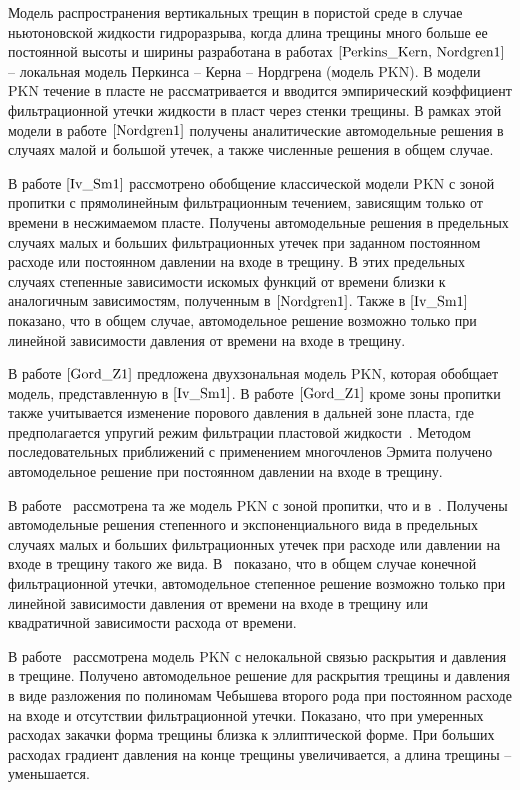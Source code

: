 Модель распространения вертикальных трещин в пористой среде в случае ньютоновской жидкости гидроразрыва, когда длина трещины много больше ее постоянной высоты и ширины разработана в работах$~\cite{Perkins_Kern, Nordgren1}$ – локальная модель Перкинса – Керна – Нордгрена (модель PKN). В модели PKN течение в пласте не рассматривается и вводится эмпирический коэффициент фильтрационной утечки жидкости в пласт через стенки трещины. В рамках этой модели в работе$~\cite{Nordgren1}$ получены аналитические автомодельные решения в случаях малой и большой утечек, а также численные решения в общем случае.



В работе$~\cite{Iv_Sm1}$ рассмотрено обобщение классической модели PKN с зоной пропитки с прямолинейным фильтрационным течением, зависящим только от времени в несжимаемом пласте. Получены автомодельные решения в предельных случаях малых и больших фильтрационных утечек при заданном постоянном расходе или постоянном давлении на входе в трещину. В этих предельных случаях степенные зависимости искомых функций от времени близки к аналогичным зависимостям, полученным в$~\cite{Nordgren1}$. Также в$~\cite{Iv_Sm1}$ показано, что в общем случае, автомодельное решение возможно только при линейной зависимости давления от времени на входе в трещину.



В работе$~\cite{Gord_Z1}$ предложена двухзональная модель PKN, которая обобщает модель, представленную в$~\cite{Iv_Sm1}$. В работе$~\cite{Gord_Z1}$ кроме зоны пропитки также учитывается изменение порового давления в дальней зоне пласта, где предполагается упругий режим фильтрации пластовой жидкости~\cite{Smirn_Tag1}. Методом последовательных приближений с применением многочленов Эрмита получено автомодельное решение при постоянном давлении на входе в трещину.



В работе~\cite{Basn1} рассмотрена та же модель PKN с зоной пропитки, что и в~\cite{Iv_Sm1}. Получены автомодельные решения степенного и экспоненциального вида в предельных случаях малых и больших фильтрационных утечек при расходе или давлении на входе в трещину такого же вида. В~\cite{Basn1} показано, что в общем случае конечной фильтрационной утечки, автомодельное степенное решение возможно только при линейной зависимости давления от времени на входе в трещину или квадратичной зависимости расхода от времени.



В работе~\cite{Teod_tr1} рассмотрена модель PKN с нелокальной связью раскрытия и давления в трещине. Получено автомодельное решение для раскрытия трещины и давления в виде разложения по полиномам Чебышева второго рода при постоянном расходе на входе и отсутствии фильтрационной утечки. Показано, что при умеренных расходах закачки форма трещины близка к эллиптической форме. При больших расходах градиент давления на конце трещины увеличивается, а длина трещины – уменьшается.



